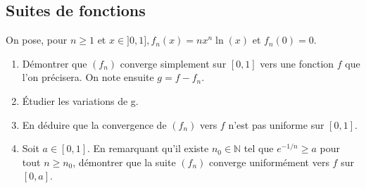 \vspace{1em}

\subsection{Suites de fonctions}
On pose, pour $n \geq 1$ et $x \in] 0,1], f_n(x)=n x^n \ln (x)$ et $f_n(0)=0$.
\begin{enumerate}[label = \alph*)]
  \item Démontrer que $\left(f_n\right)$ converge simplement sur $[0,1]$ vers une fonction $f$ que l'on précisera. On note ensuite $g=f-f_n$.
  \item Étudier les variations de g.
  \item En déduire que la convergence de $\left(f_n\right)$ vers $f$ n'est pas uniforme sur $[0,1]$.
  \item Soit $a \in[0,1]$. En remarquant qu'il existe $n_0 \in \mathbb{N}$ tel que $e^{-1 / n} \geq a$ pour tout $n \geq n_0$, démontrer que la suite $\left(f_n\right)$ converge uniformément vers $f$ sur $[0, a]$.
\end{enumerate}